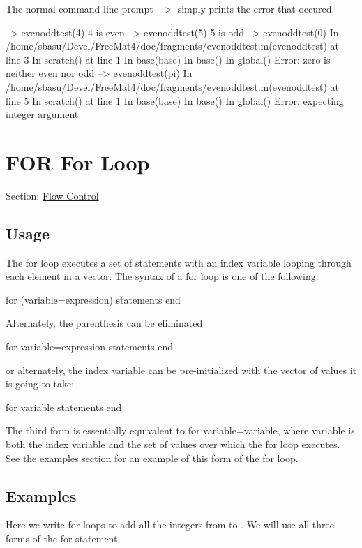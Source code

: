 The normal command line prompt {\ttfamily --$>$} simply prints the error that occured.


\begin{DoxyVerbInclude}
--> evenoddtest(4)
4 is even
--> evenoddtest(5)
5 is odd
--> evenoddtest(0)
In /home/sbasu/Devel/FreeMat4/doc/fragments/evenoddtest.m(evenoddtest) at line 3
    In scratch() at line 1
    In base(base)
    In base()
    In global()
Error: zero is neither even nor odd
--> evenoddtest(pi)
In /home/sbasu/Devel/FreeMat4/doc/fragments/evenoddtest.m(evenoddtest) at line 5
    In scratch() at line 1
    In base(base)
    In base()
    In global()
Error: expecting integer argument
\end{DoxyVerbInclude}
 \hypertarget{flow_for}{}\section{F\-O\-R For Loop}\label{flow_for}
Section\-: \hyperlink{sec_flow}{Flow Control} \hypertarget{vtkwidgets_vtkxyplotwidget_Usage}{}\subsection{Usage}\label{vtkwidgets_vtkxyplotwidget_Usage}
The {\ttfamily for} loop executes a set of statements with an index variable looping through each element in a vector. The syntax of a {\ttfamily for} loop is one of the following\-: \begin{DoxyVerb}  for (variable=expression)
     statements
  end
\end{DoxyVerb}
 Alternately, the parenthesis can be eliminated \begin{DoxyVerb}  for variable=expression
     statements
  end
\end{DoxyVerb}
 or alternately, the index variable can be pre-\/initialized with the vector of values it is going to take\-: \begin{DoxyVerb}  for variable
     statements
  end
\end{DoxyVerb}
 The third form is essentially equivalent to {\ttfamily for variable=variable}, where {\ttfamily variable} is both the index variable and the set of values over which the for loop executes. See the examples section for an example of this form of the {\ttfamily for} loop. \hypertarget{variables_matrix_Examples}{}\subsection{Examples}\label{variables_matrix_Examples}
Here we write {\ttfamily for} loops to add all the integers from {} to {}. We will use all three forms of the {\ttfamily for} statement.


